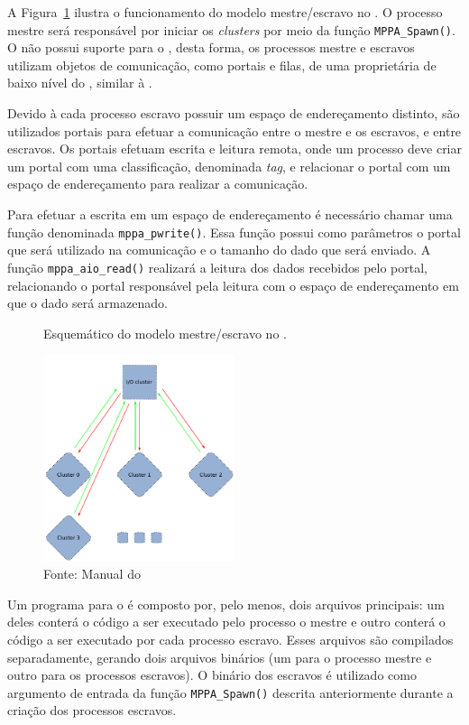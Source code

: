 A Figura~\ref{fig:MPPAIPCTutorial} ilustra o funcionamento do modelo mestre/escravo
no \mppa. O processo mestre será responsável por iniciar os
\textit{clusters} por meio da função \texttt{MPPA\_Spawn()}.
O \mppa não possui suporte para o \mpi, desta forma, os processos mestre e
escravos utilizam objetos de comunicação, como portais e filas, de
uma \api proprietária de baixo nível do \mppa, similar à \posix \ipc.

Devido à cada processo escravo possuir um espaço de endereçamento distinto, são
utilizados portais para efetuar a comunicação entre o mestre e os escravos, e entre escravos. Os
portais efetuam escrita e leitura remota, onde um processo deve criar um portal
com uma classificação, denominada \textit{tag}, e relacionar o portal com um
espaço de endereçamento para realizar a comunicação.

Para efetuar a escrita em um espaço de endereçamento é necessário chamar uma
função denominada \texttt{mppa\_pwrite()}. Essa função possui como parâmetros o
portal que será utilizado na comunicação e o tamanho do dado que será enviado.
A função \texttt{mppa\_aio\_read()} realizará a leitura dos dados recebidos pelo
portal, relacionando o portal responsável pela leitura com o espaço de
endereçamento em que o dado será armazenado.

\begin{figure}
	\centering
	\caption{Esquemático do modelo mestre/escravo no \mppa.}
	\includegraphics[width=0.5\textwidth]{figs/MPPAIPCTutorial.pdf}
    \caption*{Fonte: Manual do \mppa}
	\label{fig:MPPAIPCTutorial}
\end{figure}

Um programa para o \mppa é composto por, pelo menos, dois arquivos principais:
um deles conterá o código a ser executado pelo processo o mestre e outro conterá o código
a ser executado por cada processo escravo. Esses arquivos são compilados separadamente,
gerando dois arquivos binários (um para o processo mestre e outro para os processos escravos).
O binário dos escravos é utilizado como argumento de entrada da função \texttt{MPPA\_Spawn()}
descrita anteriormente durante a criação dos processos escravos.

